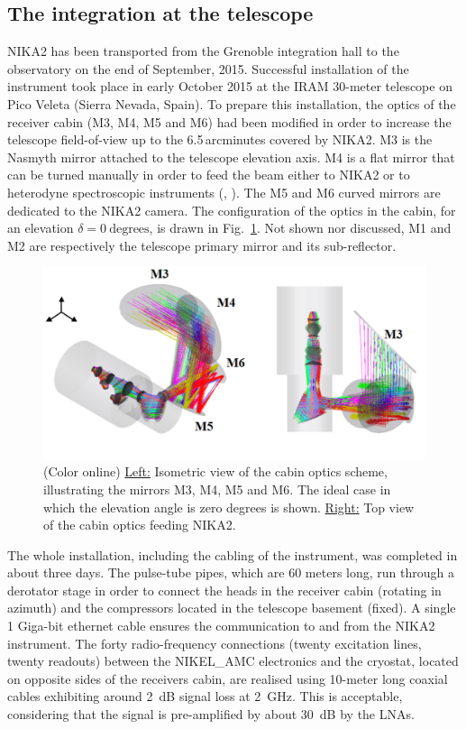 \documentclass[]{aa} %
\begin{document}
\subsection{The integration at the telescope}
\label{The integration at the telescope}

NIKA2 has been transported from the Grenoble integration hall to the observatory on the end of September, 2015. Successful installation of the instrument took place in early October 2015 at the IRAM 30-meter telescope on Pico Veleta (Sierra Nevada, Spain). To prepare this installation, the optics of the receiver cabin (M3, M4, M5 and M6) had been modified in order to increase the telescope field-of-view up to the 6.5\,arcminutes covered by NIKA2. M3 is the Nasmyth mirror attached to the telescope elevation axis. M4 is a flat mirror that can be turned manually in order to feed the beam either to NIKA2 or to heterodyne spectroscopic instruments (\cite{Carter2012}, \cite{Schuster2004}). The M5 and M6 curved mirrors are dedicated to the NIKA2 camera. The configuration of the optics in the cabin, for an elevation $\delta = 0~\textrm{degrees}$, is drawn in Fig.~\ref{figCabin}. Not shown nor discussed, M1 and M2 are respectively the telescope primary mirror and its sub-reflector. 

\begin{figure}[h]
   \centering
    \includegraphics[width=.85\linewidth]{figCabin.png}
      \caption{(Color online) \underline{Left:} Isometric view of the cabin optics scheme, illustrating the mirrors M3, M4, M5 and M6. The ideal case in which the elevation angle is zero degrees is shown. \underline{Right:} Top view of the cabin optics feeding NIKA2.}
         \label{figCabin}
\end{figure}

The whole installation, including the cabling of the instrument, was completed in about three days. The pulse-tube pipes, which are 60 meters long, run through a derotator stage in order to connect the heads in the receiver cabin (rotating in azimuth) and the compressors located in the telescope basement (fixed). A single 1 Giga-bit ethernet cable ensures the communication to and from the NIKA2 instrument. The forty radio-frequency connections (twenty excitation lines, twenty readouts) between the NIKEL\_AMC electronics and the cryostat, located on opposite sides of the receivers cabin, are realised using 10-meter long coaxial cables exhibiting around 2~dB signal loss at 2~GHz. This is acceptable, considering that the signal is pre-amplified by about 30~dB by the LNAs. 
\end{document}
